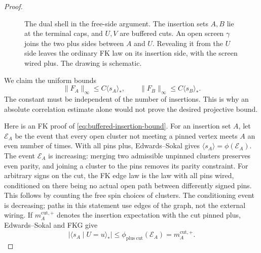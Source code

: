 \begin{proof}
\begin{figure}[t]
\centering
{}
\caption{The dual shell in the free-side argument. The insertion sets
$A,B$ lie at the terminal caps, and $U,V$ are buffered cuts. An open
screen $\gamma$ joins the two plus sides between $A$ and $U$.
Revealing it from the $U$ side leaves the ordinary FK law on its
insertion side, with the screen wired plus. The drawing is schematic.}
\label{fig:boundary-screen}
\end{figure}

We claim the uniform bounds
\begin{equation}
 \|F_A\|_\infty\le C\langle s_A\rangle_*,
 \qquad
 \|F_B\|_\infty\le C\langle s_B\rangle_*.
 \label{eq:buffered-insertion-bound}
\end{equation}
The constant must be independent of the number of insertions.
This is why an absolute correlation estimate alone would not prove
the desired projective bound.

Here is an FK proof of \eqref{eq:buffered-insertion-bound}. For an
insertion set $A$, let $\mathcal E_A$ be the event that every open
cluster not meeting a pinned vertex meets $A$ an even number of times.
With all pins plus, Edwards--Sokal gives
$\langle s_A\rangle=\phi(\mathcal E_A)$. The event
$\mathcal E_A$ is increasing: merging two admissible unpinned clusters
preserves even parity, and joining a cluster to the pins removes its
parity constraint. For arbitrary signs on the cut, the FK edge law
is the law with all pins wired, conditioned on there being no actual
open path between differently signed pins. This follows by counting
the free spin choices of clusters. The conditioning event is
decreasing; paths in this statement use edges of the graph, not the
external wiring. If $m_A^{\mathrm{cut},+}$ denotes the insertion
expectation with the cut pinned plus, Edwards--Sokal and FKG give
\begin{equation}
   |\langle s_A\mid U=u\rangle_*|
       \le\phi_{\mathrm{plus\ cut}}(\mathcal E_A)
       =m_A^{\mathrm{cut},+}.
 \label{eq:insertion-plus-cut}
\end{equation}


\end{proof}
